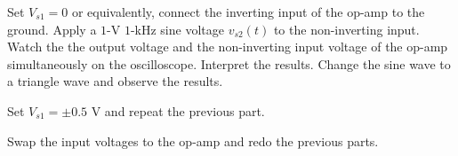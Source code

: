 \documentclass[11pt]{article}
\begin{document}
\begin{question}
    \begin{subquestion}{Set $V_{s1}=0$ or equivalently, connect the inverting input of the op-amp to the ground. Apply a $1$-V $1$-kHz sine voltage $v_{s2}(t)$ to the non-inverting input. Watch the the output voltage and the non-inverting input voltage of the op-amp simultaneously on the oscilloscope. Interpret the results. Change the sine wave to a triangle wave and observe the results.}
        \answer{}
    \end{subquestion}

    \begin{subquestion}{Set $V_{s1}=\pm 0.5$ V and repeat the previous part.}
        \answer{}
    \end{subquestion}

    \begin{subquestion}{Swap the input voltages to the op-amp and redo the previous parts.}
        \answer{}
    \end{subquestion}


\end{question}

\end{document}
